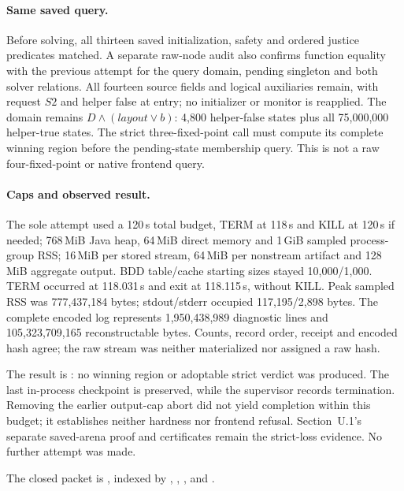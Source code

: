 \paragraph{Same saved query.}
Before solving, all thirteen saved initialization, safety and ordered
justice predicates matched. A separate raw-node audit also confirms
function equality with the previous attempt for the query domain, pending
singleton and both solver relations. All fourteen source fields and
logical auxiliaries remain, with request $S2$ and helper false at entry;
no initializer or monitor is reapplied. The domain remains
$D\land(\mathit{layout}\lor b)$: 4,800 helper-false states plus all
75,000,000 helper-true states. The strict three-fixed-point
 call must compute its complete winning region before the
pending-state membership query. This is not a raw four-fixed-point or
native frontend query.

\paragraph{Caps and observed result.}
The sole attempt used a 120\,s total budget, TERM at 118\,s and KILL at
120\,s if needed; 768\,MiB Java heap, 64\,MiB direct memory and
1\,GiB sampled process-group RSS; 16\,MiB per stored stream,
64\,MiB per nonstream artifact and 128\,MiB aggregate output.
BDD table/cache starting sizes stayed 10,000/1,000.
TERM occurred at 118.031\,s and exit at 118.115\,s, without KILL.
Peak sampled RSS was 777,437,184 bytes; stdout/stderr occupied
117,195/2,898 bytes. The complete encoded log represents 1,950,438,989
diagnostic lines and 105,323,709,165 reconstructable bytes. Counts,
record order, receipt and encoded hash agree; the raw stream was neither
materialized nor assigned a raw hash.

The result is : no winning region or adoptable
strict verdict was produced. The last in-process 
checkpoint is preserved, while the supervisor records termination.
Removing the earlier output-cap abort did not yield completion within
this budget; it establishes neither hardness nor frontend refusal.
Section~U.1's separate saved-arena proof and certificates remain the
strict-loss evidence. No further attempt was made.

The closed packet is
, indexed by
, , ,
 and .
